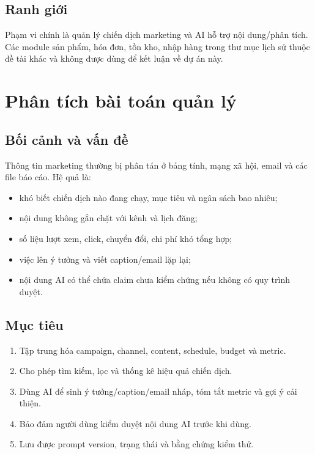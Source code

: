 \documentclass[12pt,a4paper]{article}
\begin{document}
\subsection{Ranh giới}
Phạm vi chính là quản lý chiến dịch marketing và AI hỗ trợ nội dung/phân tích.
Các module sản phẩm, hóa đơn, tồn kho, nhập hàng trong thư mục lịch sử thuộc đề
tài khác và không được dùng để kết luận về dự án này.

\section{Phân tích bài toán quản lý}
\subsection{Bối cảnh và vấn đề}
Thông tin marketing thường bị phân tán ở bảng tính, mạng xã hội, email và các
file báo cáo. Hệ quả là:
\begin{itemize}
  \item khó biết chiến dịch nào đang chạy, mục tiêu và ngân sách bao nhiêu;
  \item nội dung không gắn chặt với kênh và lịch đăng;
  \item số liệu lượt xem, click, chuyển đổi, chi phí khó tổng hợp;
  \item việc lên ý tưởng và viết caption/email lặp lại;
  \item nội dung AI có thể chứa claim chưa kiểm chứng nếu không có quy trình duyệt.
\end{itemize}

\subsection{Mục tiêu}
\begin{enumerate}
  \item Tập trung hóa campaign, channel, content, schedule, budget và metric.
  \item Cho phép tìm kiếm, lọc và thống kê hiệu quả chiến dịch.
  \item Dùng AI để sinh ý tưởng/caption/email nháp, tóm tắt metric và gợi ý cải thiện.
  \item Bảo đảm người dùng kiểm duyệt nội dung AI trước khi dùng.
  \item Lưu được prompt version, trạng thái và bằng chứng kiểm thử.
\end{enumerate}
\end{document}
